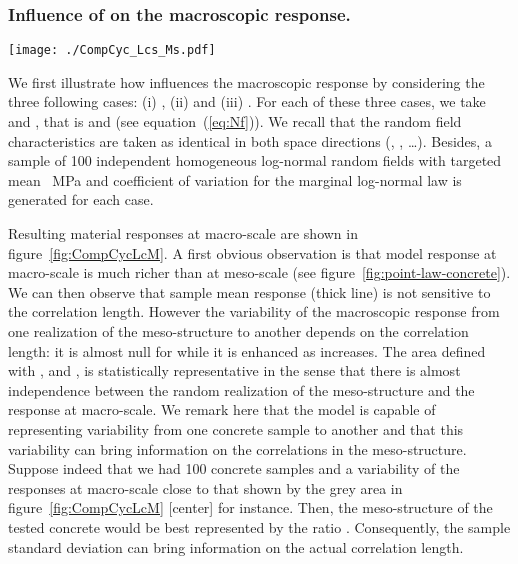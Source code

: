 \documentclass[12p]{amsart}
\begin{document}
\subsubsection{Influence of  on the macroscopic response.}

\begin{figure*}[htb]
\begin{center}
 \texttt{[image: ./CompCyc\_Lcs\_Ms.pdf]}
\caption{Sample mean (thick plain line) plus/minus standard deviation (boundaries of the shaded areas) monotonic response at macro-scale computed from a sample of 100 realizations of the material structure at meso-scale with ~MPa and  for the log-normal marginal law. Meso-structures are generated with different correlation lengths: [left] , [center] , [right] . Cyclic response for one particular realization of the meso-structure is also shown (thin plain line).}
\label{fig:CompCycLcM}
\end{center}
\end{figure*}

We first illustrate how  influences the macroscopic response by considering the three following cases: (i) , (ii)  and (iii) . For each of these three cases, we take  and , that is  and  (see  equation~(\ref{eq:Nf})). We recall that the random field characteristics are taken as identical in both space directions (, , \ldots). Besides, a sample of 100 independent homogeneous log-normal random fields with targeted mean ~MPa and coefficient of variation  for the marginal log-normal law is generated for each case.

Resulting material responses at macro-scale are shown in figure~\ref{fig:CompCycLcM}. A first obvious observation is that model response at macro-scale is much richer than at meso-scale (see figure~\ref{fig:point-law-concrete}). We can then observe that sample mean response (thick line) is not sensitive to the correlation length. However the variability of the macroscopic response from one realization of the meso-structure to another depends on the correlation length: it is almost null for  while it is enhanced as  increases. The area  defined with ,  and , is statistically representative in the sense that there is almost independence between the random realization of the meso-structure and the response at macro-scale. We remark here that the model is capable of representing variability from one concrete sample to another and that this variability can bring information on the correlations in the meso-structure. Suppose indeed that we had 100 concrete samples and a variability of the responses at macro-scale close to that shown by the grey area in figure~\ref{fig:CompCycLcM} [center] for instance. Then, the meso-structure of the tested concrete would be best represented by the ratio . Consequently, the sample standard deviation can bring information on the actual correlation length.
\end{document}
